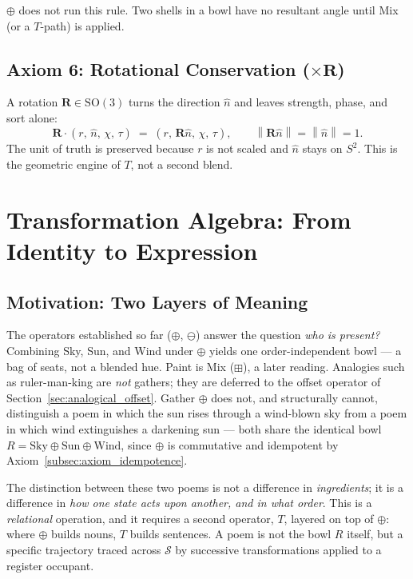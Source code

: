 \documentclass[12pt, a4paper]{article}
\providecommand{\norm}[1]{\left\lVert#1\right\rVert}
\begin{document}
$\oplus$ does not run this rule. Two shells in a bowl have no
resultant angle until Mix (or a $T$-path) is applied.

\subsection{Axiom 6: Rotational Conservation (\texorpdfstring{$\times \mathbf{R}$}{x R})}
\label{subsec:axiom_rotation}
A rotation $\mathbf{R} \in \mathrm{SO}(3)$ turns the direction $\hat n$ and leaves strength, phase, and sort alone:
\begin{equation}
    \mathbf{R}\cdot(r,\,\hat n,\,\chi,\,\tau)
    \;=\;
    (r,\,\mathbf{R}\hat n,\,\chi,\,\tau),
    \qquad
    \norm{\mathbf{R}\hat n} = \norm{\hat n} = 1.
\end{equation}
The unit of truth is preserved because $r$ is not scaled and $\hat n$ stays on $S^2$. This is the geometric engine of $T$, not a second blend.

\section{Transformation Algebra: From Identity to Expression}
\label{sec:transformation_algebra}

\subsection{Motivation: Two Layers of Meaning}
\label{subsec:transform_motivation}
The operators established so far ($\oplus$, $\ominus$) answer the question
\emph{who is present?} Combining Sky, Sun, and Wind under $\oplus$
yields one order-independent bowl --- a bag of seats, not a blended
hue. Paint is Mix ($\boxplus$), a later reading. Analogies such as ruler-man-king are \emph{not} gathers; they are deferred to the offset operator of Section~\ref{sec:analogical_offset}. Gather $\oplus$ does not, and structurally
cannot, distinguish a poem in which the sun rises through a wind-blown
sky from a poem in which wind extinguishes a darkening sun --- both
share the identical bowl
$R = \text{Sky} \oplus \text{Sun} \oplus \text{Wind}$, since $\oplus$
is commutative and idempotent by Axiom~\ref{subsec:axiom_idempotence}.

The distinction between these two poems is not a difference in
\emph{ingredients}; it is a difference in \emph{how one state acts
upon another, and in what order}. This is a \emph{relational}
operation, and it requires a second operator, $T$, layered on top of
$\oplus$: where $\oplus$ builds nouns, $T$ builds sentences. A poem is
not the bowl $R$ itself, but a specific trajectory traced across
$\mathcal{S}$ by successive transformations applied to a register occupant.
\end{document}
